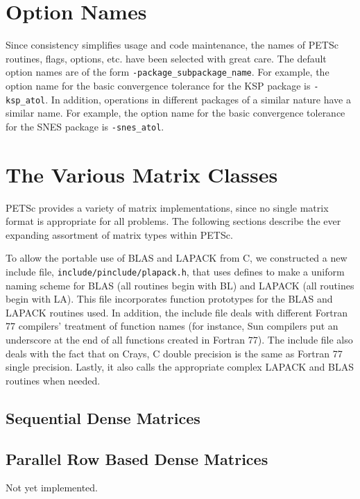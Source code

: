 \section{Option Names}

Since consistency simplifies usage and code maintenance, the names of
PETSc routines, flags, options, etc. have been selected with great care.
The default option names are of the form {\tt -package\_subpackage\_name}.  
For example, the option name for the basic convergence tolerance for 
the KSP package is {\tt -ksp\_atol}. In addition, operations in different 
packages of a similar nature have a similar name.  For example, the option
name for the basic convergence tolerance for the SNES package is 
{\tt -snes\_atol}.


\section{The Various Matrix Classes}

PETSc provides a variety of matrix implementations, since no single
matrix format is appropriate for all problems. The following sections
describe the ever expanding assortment of matrix types within PETSc.

\begin{design}
To allow the portable use of BLAS and LAPACK from C, we constructed a
new include file, {\tt include/pinclude/plapack.h}, that uses defines to make
a uniform naming scheme for BLAS (all routines begin with BL) and
LAPACK (all routines begin with LA). This file incorporates function
prototypes for the BLAS and LAPACK routines used. In addition, the
include file deals with different Fortran 77 compilers' treatment of
function names (for instance, Sun compilers put an underscore at the
end of all functions created in Fortran 77).  The include file also
deals with the fact that on Crays, C double precision is the same as
Fortran 77 single precision.  Lastly, it also calls the appropriate
complex LAPACK and BLAS routines when needed.
\end{design}

\subsection{Sequential Dense Matrices}

\subsection{Parallel Row Based Dense Matrices}
Not yet implemented.

